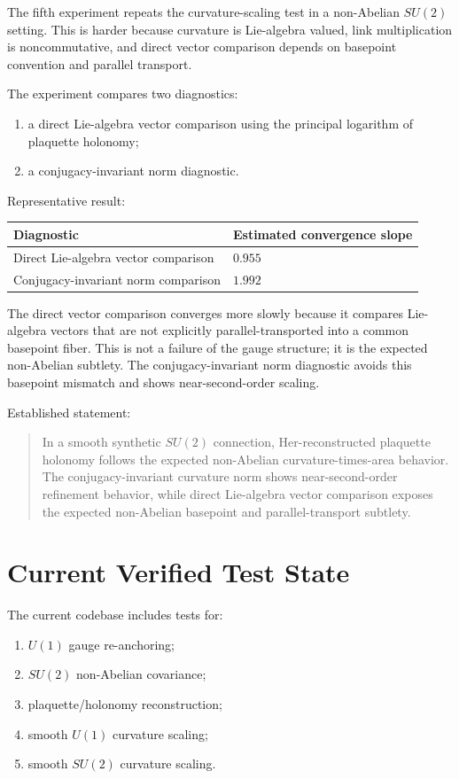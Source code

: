 \documentclass[11pt]{article}
\newcommand{\Uone}{U(1)}
\newcommand{\Sutwo}{SU(2)}
\begin{document}
The fifth experiment repeats the curvature-scaling test in a non-Abelian \(\Sutwo\) setting.  This is harder because curvature is Lie-algebra valued, link multiplication is noncommutative, and direct vector comparison depends on basepoint convention and parallel transport.

The experiment compares two diagnostics:
\begin{enumerate}[leftmargin=1.5em]
\item a direct Lie-algebra vector comparison using the principal logarithm of plaquette holonomy;
\item a conjugacy-invariant norm diagnostic.
\end{enumerate}

Representative result:
\begin{center}
\begin{tabular}{ll}
\toprule
Diagnostic & Estimated convergence slope \\
\midrule
Direct Lie-algebra vector comparison & \(0.955\) \\
Conjugacy-invariant norm comparison & \(1.992\) \\
\bottomrule
\end{tabular}
\end{center}

The direct vector comparison converges more slowly because it compares Lie-algebra vectors that are not explicitly parallel-transported into a common basepoint fiber.  This is not a failure of the gauge structure; it is the expected non-Abelian subtlety.  The conjugacy-invariant norm diagnostic avoids this basepoint mismatch and shows near-second-order scaling.

Established statement:
\begin{quote}
In a smooth synthetic \(\Sutwo\) connection, Her-reconstructed plaquette holonomy follows the expected non-Abelian curvature-times-area behavior.  The conjugacy-invariant curvature norm shows near-second-order refinement behavior, while direct Lie-algebra vector comparison exposes the expected non-Abelian basepoint and parallel-transport subtlety.
\end{quote}

\section{Current Verified Test State}

The current codebase includes tests for:
\begin{enumerate}[leftmargin=1.5em]
\item \(\Uone\) gauge re-anchoring;
\item \(\Sutwo\) non-Abelian covariance;
\item plaquette/holonomy reconstruction;
\item smooth \(\Uone\) curvature scaling;
\item smooth \(\Sutwo\) curvature scaling.
\end{enumerate}
\end{document}
